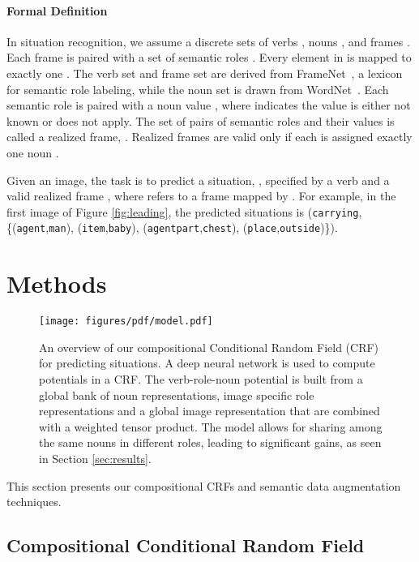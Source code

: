 \documentclass[10pt,twocolumn,letterpaper]{article}
\begin{document}
\paragraph{Formal Definition}
In situation recognition, we assume a discrete sets of verbs , nouns , and frames .
Each frame  is paired with a set of semantic roles .
Every element in  is mapped to exactly one . 
The verb set  and frame set  are derived from FrameNet~\cite{framenet}, a lexicon for semantic role labeling, while the noun set  is drawn from WordNet~\cite{wordnet}.
Each semantic role  is paired with a noun value , where  indicates the value is either not known or does not apply.
The set of pairs of semantic roles and their values is called a realized frame, . 
Realized frames are valid only if each  is assigned exactly one noun .

Given an image, the task is to predict a situation, , specified by a verb  and a valid realized frame , where  refers to a frame mapped by  . For example, in the first image of Figure \ref{fig:leading}, the predicted situations is 
{\small  (\texttt{carrying}, \{(\texttt{agent},\texttt{man}), (\texttt{item},\texttt{baby}), (\texttt{agentpart},\texttt{chest}), (\texttt{place},\texttt{outside})\})}.

%
 \section{Methods}
\label{sec:model}
\begin{figure*}[t]
\centering
\texttt{[image: figures/pdf/model.pdf]}
\vspace{-.75in}
\caption{\small An overview of our compositional Conditional Random Field (CRF) for predicting situations. 
A deep neural network is used to compute potentials in a CRF.
The verb-role-noun potential is built from 
a global bank of noun representations, image specific role representations and a global image representation that are combined with a weighted tensor product. 
The model allows for sharing among the same nouns in different roles, leading to significant gains, as seen in Section \ref{sec:results}. }
\label{fig:model}
\end{figure*}

This section presents our compositional CRFs and semantic data augmentation techniques.

\subsection{Compositional Conditional Random Field}
\end{document}
